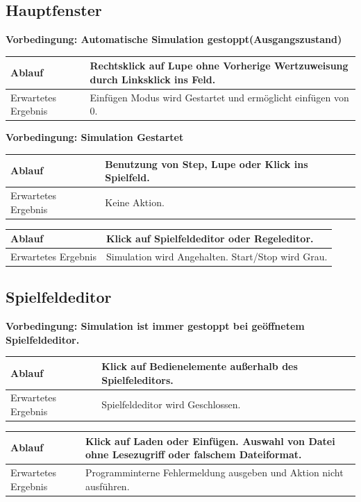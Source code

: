 \documentclass[11pt,a4paper]{article}
\begin{document}
\subsection{Hauptfenster}
\textbf{Vorbedingung: Automatische Simulation gestoppt(Ausgangszustand)}

\begin{longtable}[m]{|m{3cm}|m{10cm}|}
\hline
Ablauf&Rechtsklick auf Lupe ohne Vorherige Wertzuweisung durch Linksklick ins Feld.\\
\hline
Erwartetes Ergebnis&Einfügen Modus wird Gestartet und ermöglicht einfügen von 0.\\
\hline
\end{longtable}


\textbf{Vorbedingung: Simulation Gestartet}

\begin{longtable}[m]{|m{3cm}|m{10cm}|}
\hline
Ablauf&Benutzung von Step, Lupe oder Klick ins Spielfeld.\\
\hline
Erwartetes Ergebnis&Keine Aktion.\\
\hline
\end{longtable}

\begin{longtable}[m]{|m{3cm}|m{10cm}|}
\hline
Ablauf&Klick auf Spielfeldeditor oder Regeleditor.\\
\hline
Erwartetes Ergebnis&Simulation wird Angehalten. Start/Stop wird Grau.\\
\hline
\end{longtable}


\subsection{Spielfeldeditor}
\textbf{Vorbedingung: Simulation ist immer gestoppt bei geöffnetem Spielfeldeditor.}

\begin{longtable}[m]{|m{3cm}|m{10cm}|}
\hline
Ablauf&Klick auf Bedienelemente außerhalb des Spielfeleditors.\\
\hline
Erwartetes Ergebnis&Spielfeldeditor wird Geschlossen.\\
\hline
\end{longtable}

\begin{longtable}[m]{|m{3cm}|m{10cm}|}
\hline
Ablauf&Klick auf Laden oder Einfügen. Auswahl von Datei ohne Lesezugriff oder falschem Dateiformat.\\
\hline
Erwartetes Ergebnis&Programminterne Fehlermeldung ausgeben und Aktion nicht ausführen.\\
\hline
\end{longtable}
\end{document}
